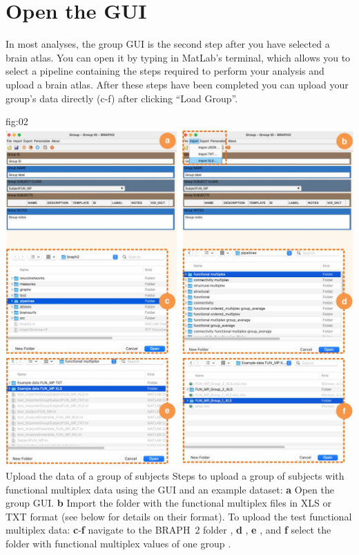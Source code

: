 \documentclass[justified]{tufte-handout}
\begin{document}
\section{Open the GUI}

In most analyses, the group GUI is the second step after you have selected a brain atlas. You can open it by typing  in MatLab's terminal, which allows you to select a pipeline containing the steps required to perform your analysis and upload a brain atlas. After these steps have been completed you can upload your group's data directly (c-f) after clicking ``Load Group''. 

	{fig:02}
	{
	\includegraphics{fig02.jpg}
	}
	{Upload the data of a group of subjects}
	{
	Steps to upload a group of subjects with functional multiplex data using the GUI and an example dataset: 
	{\bf a} Open the group GUI.
	{\bf b} Import the folder with the functional multiplex files in XLS or TXT format (see below for details on their format).
	To upload the test functional multiplex data:
	{\bf c}-{\bf f} navigate to the BRAPH~2 folder , {\bf d} ,  {\bf e} , and {\bf f} select the folder with functional multiplex values of one group .
	}

\end{document}
